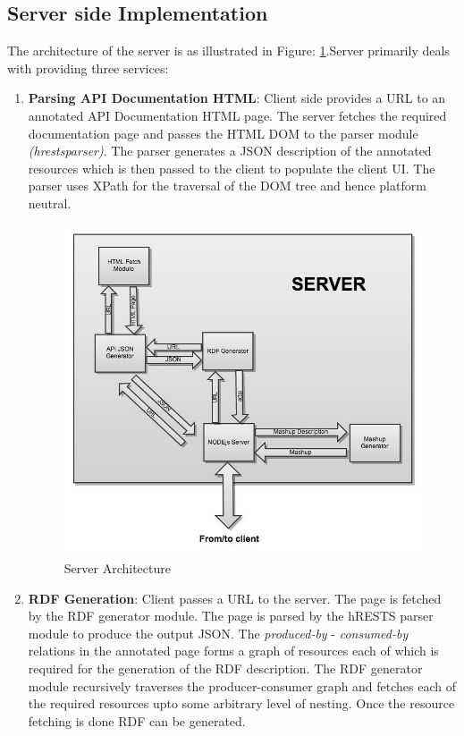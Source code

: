 \begin{spacing}{1.5}
\section{Server side Implementation}
The architecture of the server is as illustrated in Figure: \ref{fig:serverarch}.Server primarily deals with providing three services:
\begin{enumerate}

\item{\bf Parsing API Documentation HTML}: Client side provides a URL to an annotated API Documentation HTML page. The server fetches the required documentation page and passes the HTML DOM to the parser module {\it(hrestsparser)}. The parser generates a JSON description of the annotated resources which is then passed to the client to populate the client UI. The parser uses XPath for the traversal of the DOM tree and hence platform neutral.

\begin{figure}
        \centering
        \includegraphics[scale=0.4]{images/Server_Architecture.jpg}
        \caption{Server Architecture}
        \label{fig:serverarch}
\end{figure}

\item{\bf RDF Generation}: Client passes a URL to the server. The page is fetched by the RDF generator module. The page is parsed by the hRESTS parser module to produce the output JSON. The {\it produced-by} - {\it consumed-by} relations in the annotated page forms a graph of resources each of which is required for the generation of the RDF description. The RDF generator module recursively traverses the producer-consumer graph and fetches each of the required resources upto some arbitrary level of nesting. Once the resource fetching is done RDF can be generated.


\end{enumerate}
\end{spacing}
